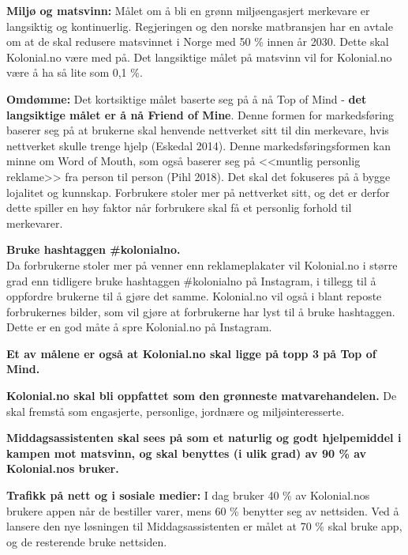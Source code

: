 \textbf{Miljø og matsvinn:}
Målet om å bli en grønn miljøengasjert merkevare er langsiktig og kontinuerlig. Regjeringen og den norske matbransjen har en avtale om at de skal redusere matsvinnet i Norge med 50 \% innen år 2030. Dette skal Kolonial.no være med på. Det langsiktige målet på matsvinn vil for Kolonial.no være å ha så lite som 0,1 \%.

\textbf{Omdømme:}
Det kortsiktige målet baserte seg på å nå Top of Mind - \textbf{det langsiktige målet er å nå Friend of Mine}. Denne formen for markedsføring baserer seg på at brukerne skal henvende nettverket sitt til din merkevare, hvis nettverket skulle trenge hjelp (Eskedal 2014). Denne markedsføringsformen kan minne om Word of Mouth, som også baserer seg på <<muntlig personlig reklame>> fra person til person (Pihl 2018). Det skal det fokuseres på å bygge lojalitet og kunnskap. Forbrukere stoler mer på nettverket sitt, og det er derfor dette spiller en høy faktor når forbrukere skal få et personlig forhold til merkevarer. 

\textbf{Bruke hashtaggen \#kolonialno.}
\\Da forbrukerne stoler mer på venner enn reklameplakater vil Kolonial.no i større grad enn tidligere bruke hashtaggen \#kolonialno på Instagram, i tillegg til å oppfordre brukerne til å gjøre det samme. Kolonial.no vil også i blant reposte forbrukernes bilder, som vil gjøre at forbrukerne har lyst til å bruke hashtaggen. Dette er en god måte å spre Kolonial.no på Instagram.

\textbf{Et av målene er også at Kolonial.no skal ligge på topp 3 på Top of Mind.}


\textbf{Kolonial.no skal bli oppfattet som den grønneste matvarehandelen.} De skal fremstå som engasjerte, personlige, jordnære og miljøinteresserte. 

\textbf{Middagsassistenten skal sees på som et naturlig og godt hjelpemiddel i kampen mot matsvinn, og skal benyttes (i ulik grad) av 90 \% av Kolonial.nos bruker.}

\textbf{Trafikk på nett og i sosiale medier:}
I dag bruker 40 \% av Kolonial.nos brukere appen når de bestiller varer, mens 60 \% benytter seg av nettsiden. Ved å lansere den nye løsningen til Middagsassistenten er målet at 70 \% skal bruke app, og de resterende bruke nettsiden.



